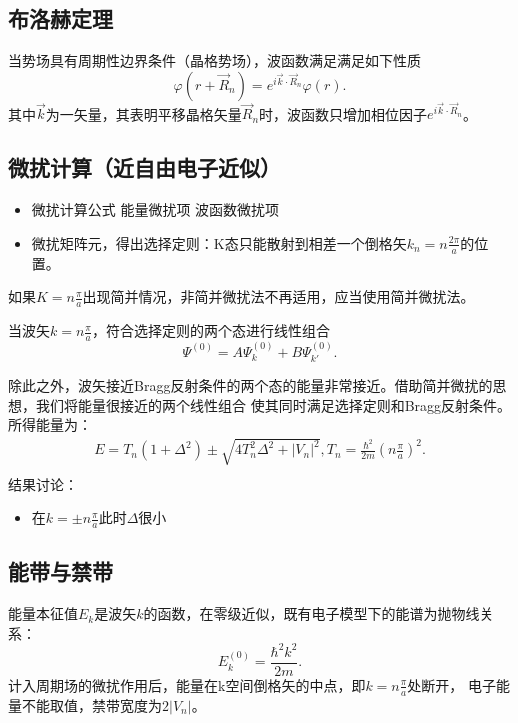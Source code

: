 \subsection[Bloch Theorem]{布洛赫定理}
    当势场具有周期性边界条件（晶格势场），波函数满足满足如下性质
    \begin{equation}
        \varphi(r+\vec{R}_n)=e^{i\vec{k}\cdot \vec{R}_n}\varphi(r).
    \end{equation}
    其中$\vec{k}$为一矢量，其表明平移晶格矢量$\vec{R}_n$时，波函数只增加相位因子$e^{i\vec{k}\cdot \vec{R}_n}$。

\subsection{微扰计算（近自由电子近似）}
\begin{itemize}
    \item 微扰计算公式
    \subitem 能量微扰项
    \subitem 波函数微扰项 
    \item 微扰矩阵元，得出选择定则：K态只能散射到相差一个倒格矢$k_n=n\frac{2\pi}{a}$的位置。
\end{itemize}
如果$K=n\frac{\pi}{a}$出现简并情况，非简并微扰法不再适用，应当使用简并微扰法。

当波矢$k=n\frac{\pi}{a}$，符合选择定则的两个态进行线性组合
\begin{equation}
    \Psi^{(0)}=A\Psi^{(0)}_k+B\Psi^{(0)}_{k'}.
\end{equation}

除此之外，波矢接近Bragg反射条件的两个态的能量非常接近。借助简并微扰的思想，我们将能量很接近的两个线性组合
使其同时满足选择定则和Bragg反射条件。所得能量为：
\begin{align}
    E=T_n(1+\Delta^2)\pm\sqrt{4T^2_n\Delta^2+|V_n|^2},
    T_n= \frac{\hbar^2}{2m}\left(n\frac{\pi}{a}\right)^2.\\
\end{align}
结果讨论：
\begin{itemize}
    \item 在$k=\pm n\frac{\pi}{a}$此时$\Delta$很小
\end{itemize}
\subsection{能带与禁带}
能量本征值$E_k$是波矢$k$的函数，在零级近似，既有电子模型下的能谱为抛物线关系：
\begin{equation*}
    E_k^{(0)}=\frac{\hbar^2k^2}{2m}.
\end{equation*}
计入周期场的微扰作用后，能量在k空间倒格矢的中点，即$k=n\frac{\pi}{a}$处断开，
电子能量不能取值，禁带宽度为$2|V_n|$。

